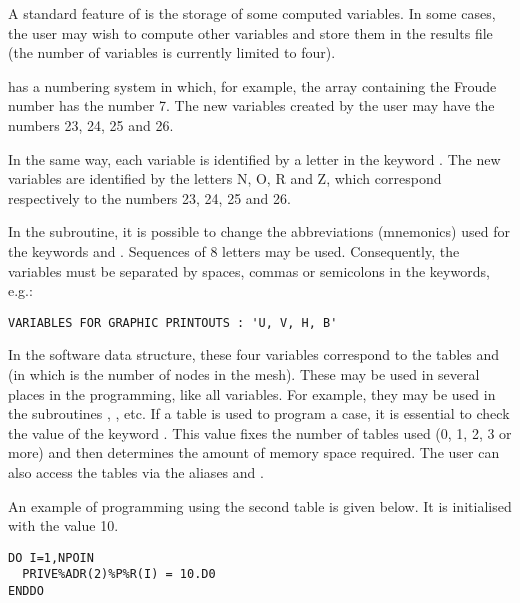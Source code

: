 A standard feature of  is the storage of some computed variables.
In some cases, the user may wish to compute other variables and store them
in the results file (the number of variables is currently limited to four).

 has a numbering system in which, for example,
the array containing the Froude number has the number 7.
The new variables created by the user may have the numbers 23, 24, 25 and 26.

In the same way, each variable is identified by a letter in the keyword
.
The new variables are identified by the letters N, O, R and Z,
which correspond respectively to the numbers 23, 24, 25 and 26.

In the  subroutine, it is
possible to change the abbreviations (mnemonics) used for the keywords
 and
.
Sequences of 8 letters may be used.
Consequently, the variables must be separated by spaces, commas or
semicolons in the keywords, e.g.:

\begin{lstlisting}[language=TelemacCas]
VARIABLES FOR GRAPHIC PRINTOUTS : 'U, V, H, B'
\end{lstlisting}

In the software data structure, these four variables correspond to the tables
and  (in which  is the number of
nodes in the mesh).
These may be used in several places in the programming, like all \tel variables.
For example, they may be used in the subroutines ,
,  etc.
If a  table is used to program a case, it is essential
to check the value of the keyword .
This value fixes the number of tables used (0, 1, 2, 3 or more)
and then determines the amount of memory space required.
The user can also access the tables via the aliases
 and .

An example of programming using the second  table is given below.
It is initialised with the value 10.

\begin{lstlisting}[language=TelFortran]
DO I=1,NPOIN
  PRIVE%ADR(2)%P%R(I) = 10.D0
ENDDO
\end{lstlisting}

